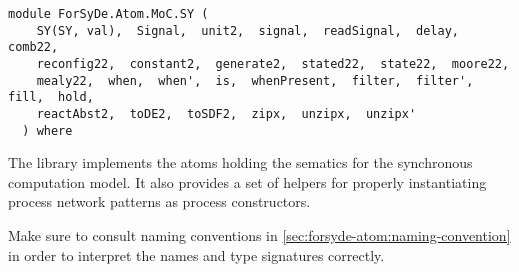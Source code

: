\label{module:ForSyDe.Atom.MoC.SY}
\haddockbeginheader
{\haddockverb\begin{verbatim}
module ForSyDe.Atom.MoC.SY (
    SY(SY, val),  Signal,  unit2,  signal,  readSignal,  delay,  comb22, 
    reconfig22,  constant2,  generate2,  stated22,  state22,  moore22, 
    mealy22,  when,  when',  is,  whenPresent,  filter,  filter',  fill,  hold, 
    reactAbst2,  toDE2,  toSDF2,  zipx,  unzipx,  unzipx'
  ) where\end{verbatim}}
\haddockendheader

The  library implements the atoms holding the sematics for the
 synchronous computation model. It also provides a set of helpers
 for properly instantiating process network patterns as process
 constructors.\par
\begin{mdframed}[style=reminder,frametitle=Reminder]Make sure to consult naming conventions in  \cref{sec:forsyde-atom:naming-convention} in order to interpret the names and type signatures correctly.\end{mdframed}\par

